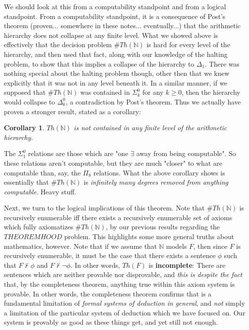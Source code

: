 \documentclass{article}
\theoremstyle{definition}
\theoremstyle{plain}
\theoremstyle{theorem}
\newtheorem{corollary}{Corollary}[section]
\begin{document}
We should look at this from a computability standpoint and from a logical standpoint. From a computability standpoint, it is a consequence of Post's theorem (proven... somewhere in these notes... eventually...) that the arithmetic hierarchy does not collapse at any finite level. What we showed above is effectively that the decision problem $\#Th({\mathbb{N}})$ is hard for every level of the hierarchy, and then used that fact, along with our knowledge of the halting problem, to show that this implies a collapse of the hierarchy to $\Delta_1$. There was nothing special about the halting problem though, other then that we knew explicitly that it was not in any level beneath it. In a similar manner, if we supposed that $\#Th({\mathbb{N}})$ was contained in $\Sigma^0_k$ for any $k \geq 0$, then the hierarchy would collapse to $\Delta^0_k$, a contradiction by Post's theorem. Thus we actually have proven a stronger result, stated as a corollary:
\begin{corollary}
    $Th({\mathbb{N}})$ is not contained in \textit{any} finite level of the arithmetic hierarchy.
\end{corollary}
The $\Sigma^0_1$ relations are those which are "one $\exists$ away from being computable". So these relations aren't computable, but they are much "closer" to what are computable than, say, the $\Pi_8$ relations. What the above corollary shows is essentially that $\#Th({\mathbb{N}})$ is \textit{infinitely many degrees removed from anything computable}. Heavy stuff. \\
\par Next, we turn to the logical implications of this theorem. Note that $\#Th(\mathbb{N})$ is recursively enumerable iff there exists a recursively enumerable set of axioms which fully axiomatizes $\#Th(\mathbb{N})$, by our previous results regarding the $THEOREMHOOD$ problem. This highlights some more general truths about mathematics, however. Note that if we assume that $\mathbb{N}$ models $F$, then since $F$ is recursively enumerable, it must be the case that there exists a sentence $\phi$ such that $F \nvdash \phi$ and $F \nvdash \neg \phi$. In other words, $Th(F)$ is \textbf{incomplete}: There are sentences which are neither provable nor disprovable, and \textit{this is despite the fact} that, by the completeness theorem, anything true within this axiom system is provable. In other words, the completeness theorem confirms that is a fundamental limitation of \textit{formal systems of deduction in general}, and \textit{not} simply a limitation of the particular system of deduction which we have focused on. Our system is provably as good as these things get, and yet still not enough.
\end{document}

